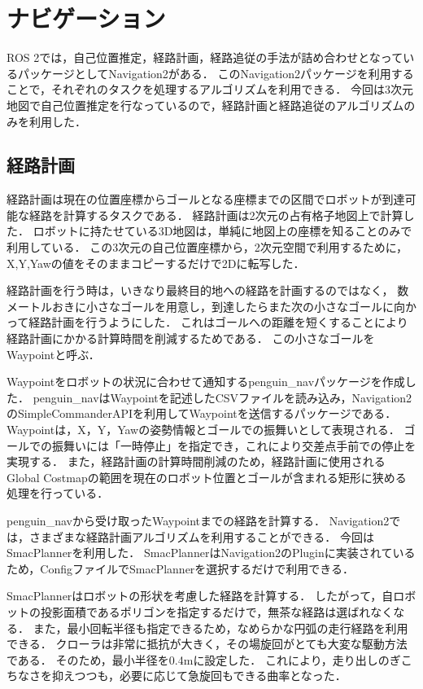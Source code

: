 \section{ナビゲーション}
ROS 2では，自己位置推定，経路計画，経路追従の手法が詰め合わせとなっているパッケージとしてNavigation2\cite{macenski2020marathon2}がある．
このNavigation2パッケージを利用することで，それぞれのタスクを処理するアルゴリズムを利用できる．
今回は3次元地図で自己位置推定を行なっているので，経路計画と経路追従のアルゴリズムのみを利用した．

\subsection{経路計画}
経路計画は現在の位置座標からゴールとなる座標までの区間でロボットが到達可能な経路を計算するタスクである．
経路計画は2次元の占有格子地図上で計算した．
ロボットに持たせている3D地図は，単純に地図上の座標を知ることのみで利用している．
この3次元の自己位置座標から，2次元空間で利用するために，X,Y,Yawの値をそのままコピーするだけで2Dに転写した．

経路計画を行う時は，いきなり最終目的地への経路を計画するのではなく，
数メートルおきに小さなゴールを用意し，到達したらまた次の小さなゴールに向かって経路計画を行うようにした．
これはゴールへの距離を短くすることにより経路計画にかかる計算時間を削減するためである．
この小さなゴールをWaypointと呼ぶ．

Waypointをロボットの状況に合わせて通知するpenguin\_navパッケージ\cite{penguinnav}を作成した．
penguin\_navはWaypointを記述したCSVファイルを読み込み，Navigation2のSimpleCommanderAPIを利用してWaypointを送信するパッケージである．
Waypointは，X，Y，Yawの姿勢情報とゴールでの振舞いとして表現される．
ゴールでの振舞いには「一時停止」を指定でき，これにより交差点手前での停止を実現する．
また，経路計画の計算時間削減のため，経路計画に使用されるGlobal Costmapの範囲を現在のロボット位置とゴールが含まれる矩形に狭める処理を行っている．

penguin\_navから受け取ったWaypointまでの経路を計算する．
Navigation2では，さまざまな経路計画アルゴリズムを利用することができる．
今回はSmacPlanner\cite{macenski2024smac}を利用した．
SmacPlannerはNavigation2のPluginに実装されているため，ConfigファイルでSmacPlannerを選択するだけで利用できる．

SmacPlannerはロボットの形状を考慮した経路を計算する．
したがって，自ロボットの投影面積であるポリゴンを指定するだけで，無茶な経路は選ばれなくなる．
また，最小回転半径も指定できるため，なめらかな円弧の走行経路を利用できる．
クローラは非常に抵抗が大きく，その場旋回がとても大変な駆動方法である．
そのため，最小半径を0.4mに設定した．
これにより，走り出しのぎこちなさを抑えつつも，必要に応じて急旋回もできる曲率となった．

